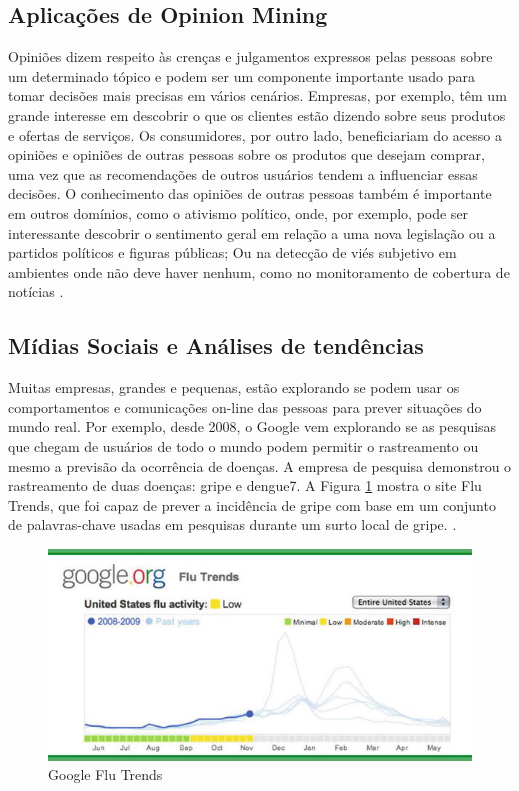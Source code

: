 \documentclass[
	12pt,				%
	openright,			%
	oneside,			%
	a4paper,			%
	english,			%
	spanish,			%
	brazil				%
	]{abntex2}
\begin{document}
	\subsection*{Aplicações de Opinion Mining}
	
	Opiniões dizem respeito às crenças e julgamentos expressos pelas pessoas sobre um determinado tópico e podem ser um componente importante usado para tomar decisões mais precisas em vários cenários\cite{book_discover_practices}. Empresas, por exemplo, têm um grande interesse em descobrir o que os clientes estão dizendo sobre seus produtos e ofertas de serviços. Os consumidores, por outro lado, beneficiariam do acesso a opiniões e opiniões de outras pessoas sobre os produtos que desejam comprar, uma vez que as recomendações de outros usuários tendem a influenciar essas decisões. O conhecimento das opiniões de outras pessoas também é importante em outros domínios, como o ativismo político, onde, por exemplo, pode ser interessante descobrir o sentimento geral em relação a uma nova legislação ou a partidos políticos e figuras públicas\cite{book_political_opinion}; Ou na detecção de viés subjetivo em ambientes onde não deve haver nenhum, como no monitoramento de cobertura de notícias \cite{book_discover_practices}.

	\subsection*{Mídias Sociais e Análises de tendências}
	Muitas empresas, grandes e pequenas, estão explorando se podem usar os comportamentos e comunicações on-line das pessoas para prever situações do mundo real. Por exemplo, desde 2008, o Google vem explorando se as pesquisas que chegam de usuários de todo o mundo podem permitir o rastreamento ou mesmo a previsão da ocorrência de doenças. A empresa de pesquisa demonstrou o rastreamento de duas doenças: gripe e dengue7. A Figura \ref{google_flu} mostra o site Flu Trends, que foi capaz de prever a incidência de gripe com base em um conjunto de palavras-chave usadas em pesquisas durante um surto local de gripe. \cite{book_social_machines}.

\begin{figure}[!h]
\centering
\includegraphics{google_flu}
\caption{Google Flu Trends}
\label{google_flu}
\end{figure}
\end{document}
